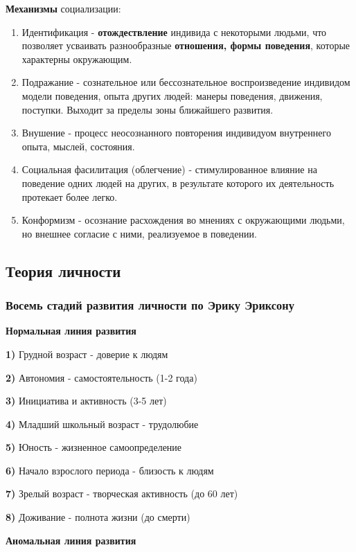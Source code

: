 \documentclass{article}
\begin{document}
\begin{flushleft}
\textbf{Механизмы} социализации:

\begin{enumerate}
    \item Идентификация - \textbf{отождествление} индивида с некоторыми людьми, что позволяет усваивать разнообразные \textbf{отношения, формы поведения}, которые характерны окружающим.
    \item Подражание - сознательное или бессознательное воспроизведение индивидом модели поведения, опыта других людей: манеры поведения, движения, поступки. Выходит за пределы зоны ближайшего развития.
    \item Внушение - процесс неосознанного повторения индивидуом внутреннего опыта, мыслей, состояния.
    \item Социальная фасилитация (облегчение) - стимулированное влияние на поведение одних людей на других, в результате которого их деятельность протекает более легко.
    \item Конформизм - осознание расхождения во мнениях с окружающими людьми, но внешнее согласие с ними, реализуемое в поведении.
\end{enumerate}

\pagebreak
\subsection{Теория личности}

\subsubsection{Восемь стадий развития личности по Эрику Эриксону}

\begin{minipage}[t]{0.48\textwidth}
\textbf{Нормальная линия развития}

\bigskip

\textbf{1) } Грудной возраст - доверие к людям

\textbf{2) } Автономия - самостоятельность (1-2 года)

\textbf{3) } Инициатива и активность (3-5 лет)

\textbf{4) } Младший школьный возраст - трудолюбие

\textbf{5) } Юность - жизненное самоопределение

\textbf{6) } Начало взрослого периода - близость к людям

\textbf{7) } Зрелый возраст - творческая активность (до 60 лет)

\textbf{8) } Доживание - полнота жизни (до смерти)
\end{minipage}
\begin{minipage}[t]{0.48\textwidth}
\textbf{Аномальная линия развития}


\end{minipage}
\end{flushleft}
\end{document}
